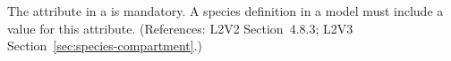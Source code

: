 The  attribute in a \Species is mandatory.  A species
definition in a model must include a value for this attribute.  (References:
L2V2 Section~4.8.3; L2V3 Section~\ref{sec:species-compartment}.)
